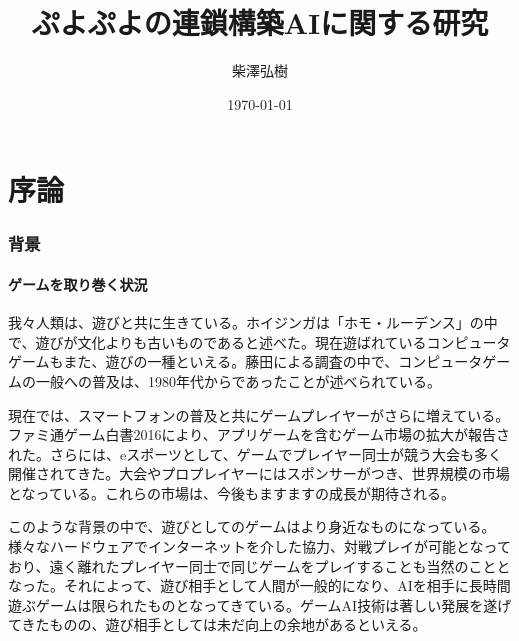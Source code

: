 \documentclass[12pt]{jarticle}
\title{}
\date{\today}
\author{柴澤弘樹}
\title{ぷよぷよの連鎖構築AIに関する研究}
\begin{document}
\maketitle

\part{序論} \setcounter{section}{0}
\section{背景}
\subsection{ゲームを取り巻く状況}
我々人類は、遊びと共に生きている。ホイジンガは「ホモ・ルーデンス」の中で、遊びが文化よりも古いものであると述べた\cite{homo}。現在遊ばれているコンピュータゲームもまた、遊びの一種といえる。藤田による調査\cite{huzita1,huzita2,huzita3}の中で、コンピュータゲームの一般への普及は、1980年代からであったことが述べられている。

現在では、スマートフォンの普及と共にゲームプレイヤーがさらに増えている。ファミ通ゲーム白書2016\cite{famitu}により、アプリゲームを含むゲーム市場の拡大が報告された。さらには、eスポーツとして、ゲームでプレイヤー同士が競う大会も多く開催されてきた。大会やプロプレイヤーにはスポンサーがつき、世界規模の市場となっている\cite{e-sports}。これらの市場は、今後もますますの成長が期待される。

このような背景の中で、遊びとしてのゲームはより身近なものになっている。様々なハードウェアでインターネットを介した協力、対戦プレイが可能となっており、遠く離れたプレイヤー同士で同じゲームをプレイすることも当然のこととなった。それによって、遊び相手として人間が一般的になり、AIを相手に長時間遊ぶゲームは限られたものとなってきている。ゲームAI技術は著しい発展を遂げてきたものの、遊び相手としては未だ向上の余地があるといえる。
\end{document}
